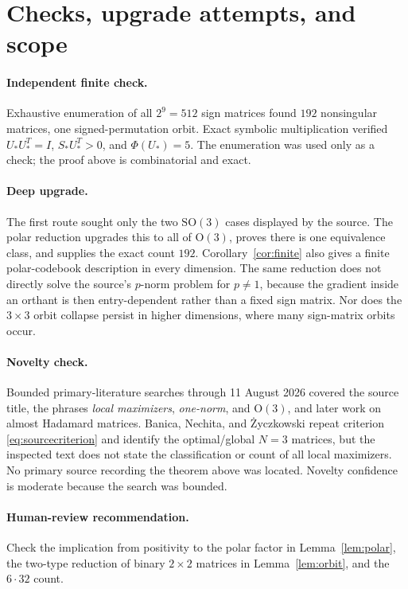 \documentclass[11pt]{article}
\newcommand{\OO}{\mathrm O}
\begin{document}
\section{Checks, upgrade attempts, and scope}

\paragraph{Independent finite check.}
Exhaustive enumeration of all \(2^9=512\) sign matrices found \(192\)
nonsingular matrices, one signed-permutation orbit. Exact symbolic
multiplication verified \(U_*U_*^T=I\), \(S_*U_*^T>0\), and
\(\Phi(U_*)=5\). The enumeration was used only as a check; the proof above
is combinatorial and exact.

\paragraph{Deep upgrade.}
The first route sought only the two \(\mathrm{SO}(3)\) cases displayed by
the source. The polar reduction upgrades this to all of \(\OO(3)\), proves
there is one equivalence class, and supplies the exact count \(192\).
Corollary~\ref{cor:finite} also gives a finite polar-codebook description
in every dimension. The same reduction does not directly solve the source's
\(p\)-norm problem for \(p\ne1\), because the gradient inside an orthant is
then entry-dependent rather than a fixed sign matrix. Nor does the
\(3\times3\) orbit collapse persist in higher dimensions, where many
sign-matrix orbits occur.

\paragraph{Novelty check.}
Bounded primary-literature searches through 11 August 2026 covered the
source title, the phrases \emph{local maximizers}, \emph{one-norm}, and
\(\OO(3)\), and later work on almost Hadamard matrices. Banica, Nechita,
and \.{Z}yczkowski \cite{BNZ} repeat criterion
\eqref{eq:sourcecriterion} and identify the optimal/global \(N=3\)
matrices, but the inspected text does not state the classification or count
of all local maximizers. No primary source recording the theorem above was
located. Novelty confidence is moderate because the search was bounded.

\paragraph{Human-review recommendation.}
Check the implication from positivity to the polar factor in
Lemma~\ref{lem:polar}, the two-type reduction of binary \(2\times2\)
matrices in Lemma~\ref{lem:orbit}, and the \(6\cdot32\) count.
\end{document}
